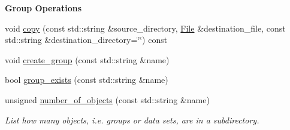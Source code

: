\begin{Indent}{\bf Group Operations}\par
{\em \label{_amgrpafb39b9128298307e8ed1d0bc43d7399}
 }\begin{DoxyCompactItemize}
\item 
void \hyperlink{classeos_1_1hdf5_1_1File_a1b00da32195932e27c8d88081f9f493c}{copy} (const std::string \&source\_\-directory, \hyperlink{classeos_1_1hdf5_1_1File}{File} \&destination\_\-file, const std::string \&destination\_\-directory=\char`\"{}\char`\"{}) const 
\item 
void \hyperlink{classeos_1_1hdf5_1_1File_a56decaf8e9350e212044f8d1b5486699}{create\_\-group} (const std::string \&name)
\item 
bool \hyperlink{classeos_1_1hdf5_1_1File_addf73185e4946dea33eb40f04c985439}{group\_\-exists} (const std::string \&name)
\item 
unsigned \hyperlink{classeos_1_1hdf5_1_1File_ab95523c1691b5c1bde956a13a04739fc}{number\_\-of\_\-objects} (const std::string \&name)
\begin{DoxyCompactList}\small\item\em List how many objects, i.e. groups or data sets, are in a subdirectory. \item\end{DoxyCompactList}\end{DoxyCompactItemize}
\end{Indent}

